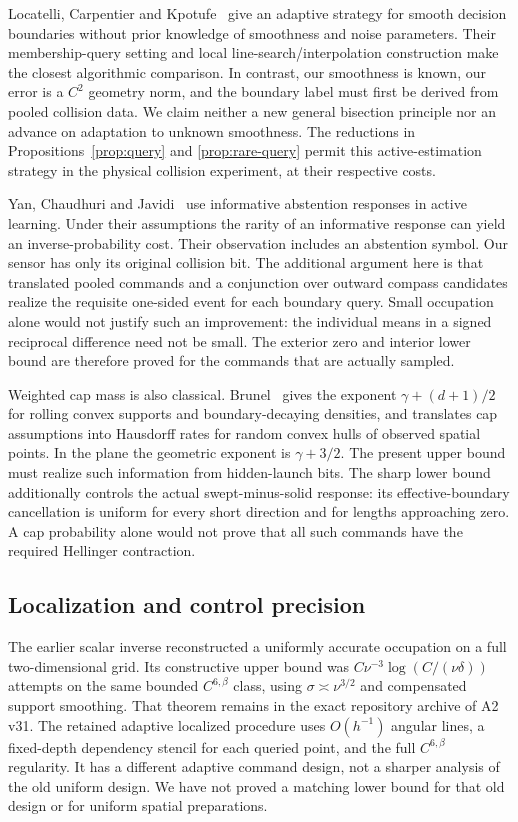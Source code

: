 Locatelli, Carpentier and Kpotufe~\cite{LCK} give an adaptive strategy
for smooth decision boundaries without prior knowledge of smoothness
and noise parameters. Their membership-query setting and local
line-search/interpolation construction make the closest algorithmic
comparison. In contrast, our smoothness is known, our error is a $C^2$
geometry norm, and the boundary label must first be derived from
pooled collision data. We claim neither a new general
bisection principle nor an advance on adaptation to unknown smoothness.
The reductions in Propositions~\ref{prop:query} and
\ref{prop:rare-query} permit this active-estimation strategy in the
physical collision experiment, at their respective costs.

Yan, Chaudhuri and Javidi~\cite{YCJ} use informative abstention
responses in active learning. Under their assumptions the rarity of
an informative response can yield an inverse-probability cost. Their
observation includes an abstention symbol. Our sensor has only its
original collision bit. The additional argument here is that translated
pooled commands and a conjunction over outward compass candidates
realize the requisite one-sided event for each boundary query. Small
occupation alone would not justify such an improvement: the individual
means in a signed reciprocal difference need not be small. The exterior
zero and interior lower bound are therefore proved for the commands
that are actually sampled.

Weighted cap mass is also classical. Brunel~\cite{BrunelCaps} gives
the exponent $\gamma+(d+1)/2$ for rolling convex supports and
boundary-decaying densities, and translates cap assumptions into
Hausdorff rates for random convex hulls of observed spatial points.
In the plane the geometric exponent is $\gamma+3/2$. The present
upper bound must realize such information from hidden-launch bits.
The sharp lower bound additionally controls the actual swept-minus-solid
response: its effective-boundary cancellation is uniform for every
short direction and for lengths approaching zero. A cap probability
alone would not prove that all such commands have the required
Hellinger contraction.

\subsection{Localization and control precision}

The earlier scalar inverse reconstructed a uniformly accurate occupation
on a full two-dimensional grid. Its constructive upper bound was
$C\nu^{-3}\log(C/(\nu\delta))$ attempts on the same bounded
$C^{6,\beta}$ class, using $\sigma\asymp\nu^{3/2}$ and compensated
support smoothing. That theorem remains in the exact repository archive of A2 v31. The retained adaptive localized
procedure uses $O(h^{-1})$ angular lines, a fixed-depth dependency
stencil for each queried point, and the full $C^{6,\beta}$ regularity.
It has a different adaptive command design, not a sharper analysis of
the old uniform design. We have not proved a matching lower bound
for that old design or for uniform spatial preparations.

